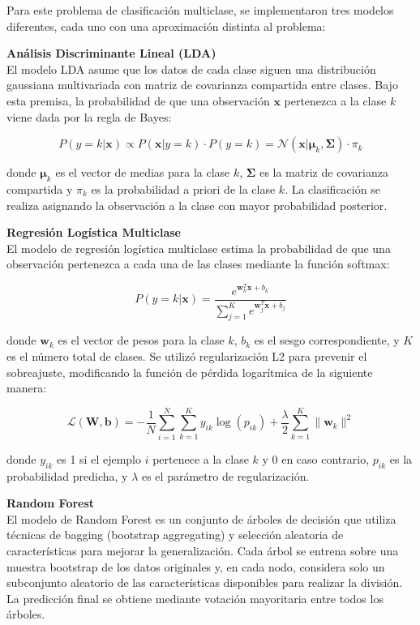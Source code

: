 Para este problema de clasificación multiclase, se implementaron tres modelos diferentes, cada uno con una aproximación distinta al problema:

\vspace{0.3cm}
\noindent \textbf{Análisis Discriminante Lineal (LDA)} \\
El modelo LDA asume que los datos de cada clase siguen una distribución gaussiana multivariada con matriz de covarianza compartida entre clases. Bajo esta premisa, la probabilidad de que una observación $\mathbf{x}$ pertenezca a la clase $k$ viene dada por la regla de Bayes:

\[
P(y = k | \mathbf{x}) \propto P(\mathbf{x} | y = k) \cdot P(y = k) = \mathcal{N}(\mathbf{x} | \boldsymbol{\mu}_k, \mathbf{\Sigma}) \cdot \pi_k
\]

donde $\boldsymbol{\mu}_k$ es el vector de medias para la clase $k$, $\mathbf{\Sigma}$ es la matriz de covarianza compartida y $\pi_k$ es la probabilidad a priori de la clase $k$. La clasificación se realiza asignando la observación a la clase con mayor probabilidad posterior.

\vspace{0.3cm}
\noindent \textbf{Regresión Logística Multiclase} \\
El modelo de regresión logística multiclase estima la probabilidad de que una observación pertenezca a cada una de las clases mediante la función softmax:

\[
P(y = k | \mathbf{x}) = \frac{e^{\mathbf{w}_k^T \mathbf{x} + b_k}}{\sum_{j=1}^K e^{\mathbf{w}_j^T \mathbf{x} + b_j}}
\]

donde $\mathbf{w}_k$ es el vector de pesos para la clase $k$, $b_k$ es el sesgo correspondiente, y $K$ es el número total de clases. Se utilizó regularización L2 para prevenir el sobreajuste, modificando la función de pérdida logarítmica de la siguiente manera:

\[
\mathcal{L}(\mathbf{W}, \mathbf{b}) = -\frac{1}{N} \sum_{i=1}^N \sum_{k=1}^K y_{ik} \log(p_{ik}) + \frac{\lambda}{2} \sum_{k=1}^K \|\mathbf{w}_k\|^2
\]

donde $y_{ik}$ es 1 si el ejemplo $i$ pertenece a la clase $k$ y 0 en caso contrario, $p_{ik}$ es la probabilidad predicha, y $\lambda$ es el parámetro de regularización.

\vspace{0.3cm}
\noindent \textbf{Random Forest} \\
El modelo de Random Forest es un conjunto de árboles de decisión que utiliza técnicas de bagging (bootstrap aggregating) y selección aleatoria de características para mejorar la generalización. Cada árbol se entrena sobre una muestra bootstrap de los datos originales y, en cada nodo, considera solo un subconjunto aleatorio de las características disponibles para realizar la división. La predicción final se obtiene mediante votación mayoritaria entre todos los árboles.

